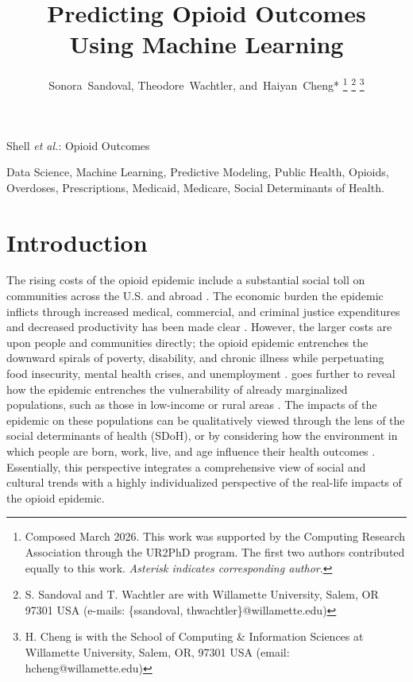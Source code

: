 \documentclass[journal]{IEEEtran}
\begin{document}
	\title{Predicting Opioid Outcomes\\ Using Machine Learning}
	\author{Sonora~Sandoval, Theodore~Wachtler, and~Haiyan~Cheng*%
	\thanks{Composed March 2026.
	This work was supported by the Computing Research Association through the UR2PhD program.
	The first two authors contributed equally to this work.
	\textit{Asterisk indicates corresponding author}.}%
	\thanks{S. Sandoval and T. Wachtler are with Willamette University, Salem, OR 97301 USA (e-mails: \{ssandoval, thwachtler\}@willamette.edu)}%
	\thanks{H. Cheng is with the School of Computing \& Information Sciences at Willamette University, Salem, OR, 97301 USA (email: hcheng@willamette.edu)}}

	{Shell \MakeLowercase{\textit{et al.}}: Opioid Outcomes}

	\maketitle

	\begin{IEEEkeywords}
		Data Science, Machine Learning, Predictive Modeling, Public Health, Opioids, Overdoses, Prescriptions, Medicaid, Medicare, Social Determinants of Health.
	\end{IEEEkeywords}

	\IEEEpeerreviewmaketitle

	\section{Introduction}

	The rising costs of the opioid epidemic include a substantial social toll on communities across the U.S. and abroad \cite{cdcUnderstandingOpioidOverdose2025}. The economic burden the epidemic inflicts through increased medical, commercial, and criminal justice expenditures and decreased productivity has been made clear \cite{murphyCostOpioidUse2020}. However, the larger costs are upon people and communities directly; the opioid epidemic entrenches the downward spirals of poverty, disability, and chronic illness while perpetuating food insecurity, mental health crises, and unemployment \cite{dasguptaOpioidCrisisNo2018}. \citeauthor{juddOpioidEpidemicReview2023} goes further to reveal how the epidemic entrenches the vulnerability of already marginalized populations, such as those in low-income or rural areas \cite{juddOpioidEpidemicReview2023}. The impacts of the epidemic on these populations can be qualitatively viewed through the lens of the social determinants of health (SDoH), or by considering how the environment in which people are born, work, live, and age influence their health outcomes \cite{cdcSocialDeterminantsHealth2024, markatouSocialDeterminantsHealth2023}. Essentially, this perspective integrates a comprehensive view of social and cultural trends with a highly individualized perspective of the real-life impacts of the opioid epidemic.
\end{document}
